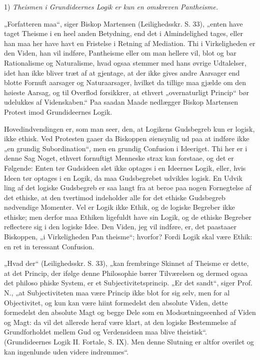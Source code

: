 \documentclass[12pt]{book}
\newcommand{\opage}[1]{\marginnote{\footnotesize\textit{[#1]}}}
\begin{document}
1) \emph{Theismen i Grundideernes Logik er kun
en omskreven Pantheisme.} %

„Forfatteren maa“, siger Biskop Martensen (Leilighedsskr.
S. 33), „enten have taget Theisme i en heel anden Betydning,
end det i Almindelighed tages, eller han maa her have havt en
Fristelse i Retning af Mediation. Thi i Virkeligheden er den
Viden, han vil indføre, Pantheisme eller om man hellere vil,
blot og bar Rationalisme og Naturalisme, hvad ogsaa stemmer
med hans øvrige Udtalelser, idet han ikke bliver træt af at
gjentage, at der ikke gives andre Aarsager end blotte Fornuft\-%
aarsager og Naturaarsager, hvilket da tillige maa gjælde om
den høieste Aarsag, og til Overflod forsikkrer, at ethvert
„overnaturligt Princip“ bør udelukkes af Videnskaben.“ Paa
saadan Maade nedlægger Biskop Martensen Protest imod
Grundideernes Logik.

Hovedindvendingen er, som man seer, den, at Logikens
Gudsbegreb kun er logisk, ikke ethisk. Ved Protesten gaaer
da Biskoppen øiensynlig ud paa at indføre ikke „en grundig
Subordination“, men en grundig Confusion i Ideeriget. Thi her
er i denne Sag Noget, ethvert fornuftigt Menneske strax kan
forstaae, og det er Følgende: Enten tør Gudsideen slet ikke
optages i en Ideernes Logik, eller, hvis Ideen tør optages i
en Logik, da maa Gudsbegrebet udvikles logisk. En Udvik\-%
ling af det logiske Gudsbegreb er saa langt fra at beroe paa
nogen Fornegtelse af det ethiske, at den tvertimod indeholder
alle for det ethiske Gudsbegreb nødvendige Momenter. Vel
er Logik ikke Ethik, og de logiske Begreber ikke ethiske; men
derfor maa Ethiken ligefuldt have sin Logik, og de ethiske
Begreber reflectere sig i den logiske Idee. Den Viden, jeg
vil indføre, er, det paastaaer Biskoppen, „i Virkeligheden Pan\-%
theisme“; hvorfor? Fordi Logik skal være Ethik: en ret in\-%
teressant Confusion.

\opage{119}\setcounter{footnote}{0}%
„Hvad der“ (Leilighedsskr. S. 33), „kan frembringe
Skinnet af Theisme er dette, at det Princip, der ifølge denne
Philosophie bærer Tilværelsen og dermed ogsaa det philoso\-%
phiske System, er et Subjectivitetsprincip. „Er det sandt“,
siger Prof. N., „at Subjectiviteten maa være Princip ikke blot
for sig selv, men for al Objectivitet, og kun kan være hiint
formedelst den absolute Viden, dette formedelst den absolute
Magt og begge Dele som en Modsætningseenhed af Viden
og Magt: da vil det allerede heraf være klart, at den logiske
Bestemmelse af Grundforholdet mellem Gud og Verdensideen
maa blive theistisk“. (Grundideernes Logik II. Fortale, S. IX).
Men denne Slutning er altfor overilet og kan ingenlunde uden
videre indrømmes“.
\end{document}
